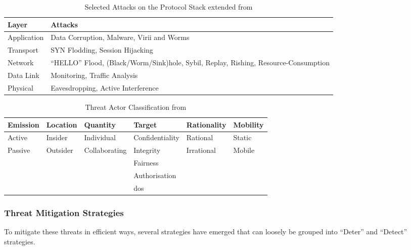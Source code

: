 \begin{table}
  \caption[Selected Attacks on the Protocol Stack]{Selected Attacks on the Protocol Stack extended from \cite{csen2010security}}
  \label{tab:stack_attacks}
  \begin{tabularx}{\textwidth}{p{5cm} X}\toprule
    Layer & Attacks\\\midrule
    Application & Data Corruption, Malware, Virii and Worms\\
    Transport & SYN Flodding, Session Hijacking\\
    Network & ``HELLO'' Flood, (Black/Worm/Sink)hole, Sybil, Replay, Rishing, Resource-Consumption\\
    Data Link & Monitoring, Traffic Analysis\\
    Physical& Eavesdropping, Active Interference\\\bottomrule
  \end{tabularx}
\end{table}

\begin{table}
  \caption[Threat Actor Classification]{Threat Actor Classification from \citet{Gagandeep2012}}
  \label{tab:attacker_class}
  \begin{tabularx}{\textwidth}{X X X X X X}\toprule
    Emission & Location & Quantity & Target & Rationality & Mobility \\\midrule
    Active & Insider & Individual & Confidentiality & Rational & Static\\
    Passive & Outsider & Collaborating & Integrity & Irrational & Mobile\\
            &         &               & Fairness & & \\
            &         &               & Authorisation & &\\
            &         &               &  \gls{dos} & &\\
    \bottomrule
    
  \end{tabularx}
\end{table}


\subsubsection{Threat Mitigation Strategies}

To mitigate these threats in efficient ways, several strategies have emerged that can loosely be grouped into ``Deter'' and ``Detect'' strategies.

